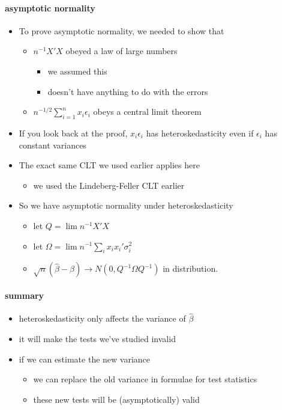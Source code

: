 \paragraph{asymptotic normality}
\begin{itemize}
\item To prove asymptotic normality, we needed to show that
\begin{itemize}
\item $n^{-1} X'X$ obeyed a law of large numbers
\begin{itemize}
\item we assumed this
\item doesn't have anything to do with the errors
\end{itemize}
\item $n^{-1/2} \sum_{i=1}^n x_i \epsilon_i$ obeys a central limit
          theorem
\end{itemize}
\item If you look back at the proof, $x_i \epsilon_i$ has
        heteroskedasticity even if $\epsilon_i$ has constant variances
\item The exact same CLT we used earlier applies here
\begin{itemize}
\item we used the Lindeberg-Feller CLT earlier
\end{itemize}
\item So we have asymptotic normality under heteroskedasticity
\begin{itemize}
\item let $Q = \lim n^{-1} X'X$
\item let $\Omega = \lim n^{-1} \sum_i x_i x_i' \sigma_i^2$
\item $\sqrt{n}(\hat\beta - \beta) \to N(0, Q^{-1} \Omega Q^{-1})$ in
          distribution.
\end{itemize}
\end{itemize}

\paragraph{summary}
\begin{itemize}
\item heteroskedasticity only affects the variance of $\hat\beta$
\item it will make the tests we've studied invalid
\item if we can estimate the new variance
\begin{itemize}
\item we can replace the old variance in formulae for test statistics
\item these new tests will be (asymptotically) valid
\end{itemize}
\end{itemize}

